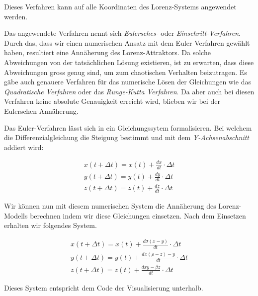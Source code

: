 Dieses Verfahren kann auf alle Koordinaten des Lorenz-Systems angewendet werden.

Das angewendete Verfahren nennt sich \textit{Eulersches-} oder \textit{Einschritt-Verfahren}. Durch das, dass wir einen numerischen Ansatz mit dem Euler Verfahren gewählt haben, resultiert eine Annäherung des Lorenz-Attraktors. Da solche Abweichungen von der tatsächlichen Lösung existieren, ist zu erwarten, dass diese Abweichungen gross genug sind, um zum chaotischen Verhalten beizutragen. Es gäbe auch genauere Verfahren für das numerische Lösen der Gleichungen wie das \textit{Quadratische Verfahren} oder das \textit{Runge-Kutta Verfahren}. Da aber auch bei diesen Verfahren keine absolute Genauigkeit erreicht wird, blieben wir bei der Eulerschen Annäherung. 

Das Euler-Verfahren lässt sich in ein Gleichungssytem formalisieren. Bei welchem die Differenzialgleichung die Steigung bestimmt und mit dem \textit{Y-Achsenabschnitt} addiert wird:

\begin{align}
    x(t+ \Delta t) = x(t) + \frac{dx}{dt} \cdot \Delta t\\
    y(t + \Delta t) = y(t) + \frac{dy}{dt} \cdot \Delta t\\
    z(t + \Delta t) = z(t) + \frac{dz}{dt} \cdot \Delta t
\end{align}

Wir können nun mit diesem numerischen System die Annäherung des Lorenz-Modells berechnen indem wir diese Gleichungen einsetzen. Nach dem Einsetzen erhalten wir folgendes System.

\begin{align}
    x(t + \Delta t) = x(t) + \frac{d \sigma(x - y)}{dt} \cdot \Delta t\\
    y(t + \Delta t) = y(t) + \frac{d x(\rho - z) - y}{dt} \cdot \Delta t\\
    z(t + \Delta t) = z(t) + \frac{d xy - \beta z}{dt} \cdot \Delta t
\end{align}

Dieses System entspricht dem Code der Visualisierung unterhalb.
